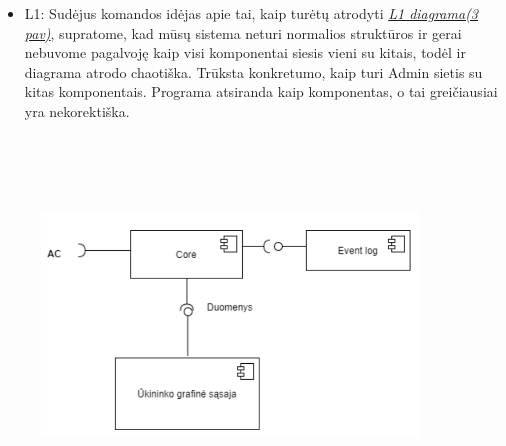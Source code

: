 \documentclass[oneside]{VUMIFPSkursinis}
\begin{document}
\begin{itemize}
	\item L1: Sudėjus komandos idėjas apie tai, kaip turėtų atrodyti \hyperref[fig:l1]{\textit{ L1 diagrama(3 pav)}}, supratome, kad mūsų sistema neturi normalios struktūros ir gerai nebuvome pagalvoję kaip visi komponentai siesis vieni su kitais, todėl ir diagrama atrodo chaotiška. Trūksta konkretumo, kaip turi Admin sietis su kitas komponentais. Programa atsiranda kaip komponentas, o tai greičiausiai yra nekorektiška.

\end{itemize}
\begin{figure}[H]
\centering	
\includegraphics[width=10cm,height=10cm,keepaspectratio]{l2uki.png}
\caption{}
\label{fig:l2uki}
\end{figure}
	
\end{document}
